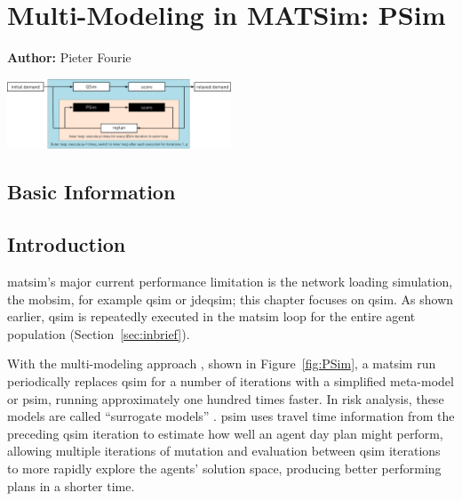 \chapter{Multi-Modeling in MATSim: PSim}
\label{ch:psim}

\hfill \textbf{Author:} Pieter Fourie

\begin{center} \includegraphics[width=0.5\textwidth, angle=0]{extending/figures/PSim/psim.pdf} \end{center}


\section{Basic Information}
\section{Introduction}
\gls{matsim}'s major current performance limitation is the network loading simulation, \ie the \gls{mobsim}, for example \gls{qsim} or \gls{jdeqsim}; 
this chapter focuses on \gls{qsim}. 
As shown earlier, \gls{qsim} is repeatedly executed in the \gls{matsim} loop for the entire agent population (Section~\ref{sec:inbrief}).

With the multi-modeling approach \citep[][]{FourieEtAl_TRR_2013}, shown in Figure~\ref{fig:PSim}, a \gls{matsim} run periodically replaces \gls{qsim} for a number of iterations with a simplified meta-model or \gls{psim}, running approximately one hundred times faster. 
In risk analysis, these models are called ``surrogate models'' \citep[][]{Sudret_APSSRA_2012}. 
\gls{psim} uses travel time information from the preceding \gls{qsim} iteration to estimate how well an agent day plan might perform, allowing multiple iterations of mutation and evaluation between \gls{qsim} iterations to more rapidly explore the agents' solution space, producing better performing plans in a shorter time.

